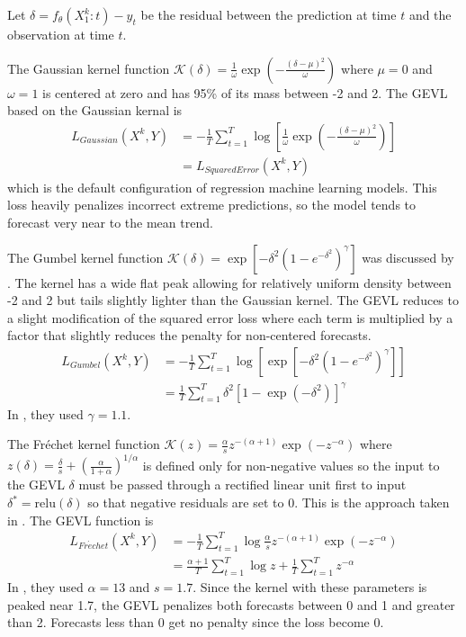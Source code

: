 \documentclass[conference]{IEEEtran}
\begin{document}
Let $\delta = f_{\theta}(X^k_1:t) - y_t$ be the residual between the prediction at time $t$ and the observation at time $t$.

The Gaussian kernel function $\mathcal{K}(\delta) = \frac{1}{\omega}\exp\left(-\frac{(\delta - \mu)^2}{\omega}\right)$ where $\mu = 0$ and $\omega = 1$ is centered at zero and has 95\% of its mass between -2 and 2. The GEVL based on the Gaussian kernal is
\begin{align*}
    L_{Gaussian}(X^k, Y) &= -\frac{1}{T} \sum_{t=1}^T \log \left[ \frac{1}{\omega}\exp\left(-\frac{(\delta - \mu)^2}{\omega} \right) \right] \\
    &= L_{SquaredError}(X^k, Y)
\end{align*}
which is the default configuration of regression machine learning models. This loss heavily penalizes incorrect extreme predictions, so the model tends to forecast very near to the mean trend.

The Gumbel kernel function $\mathcal{K}(\delta) = \exp\left[-\delta^2(1 - e^{-\delta^2})^\gamma \right]$ was discussed by \cite{zhangEnhancingTimeSeries2021}. The kernel has a wide flat peak allowing for relatively uniform density between -2 and 2 but tails slightly lighter than the Gaussian kernel. The GEVL reduces to a slight modification of the squared error loss where each term is multiplied by a factor that slightly reduces the penalty for non-centered forecasts.
\begin{align*}
    L_{Gumbel}(X^k, Y) &= -\frac{1}{T} \sum_{t=1}^T \log \left[\exp\left[-\delta^2(1 - e^{-\delta^2})^\gamma \right]\right] \\
    &= \frac{1}{T} \sum_{t=1}^T \delta^2 \left[1 - \exp\left(-\delta^2\right)\right]^\gamma
\end{align*}
In \cite{zhangEnhancingTimeSeries2021}, they used $\gamma = 1.1$.

The Fr\'echet kernel function $\mathcal{K}(z) = \frac{\alpha}{s} z^{-(\alpha + 1)} \exp\left(-z^{-\alpha}\right)$ where $z(\delta) = \frac{\delta}{s} + \left(\frac{\alpha}{1+\alpha}\right)^{1/\alpha}$ is defined only for non-negative values so the input to the GEVL $\delta$ must be passed through a rectified linear unit first to input $\delta^* = \mathrm{relu}(\delta)$ so that negative residuals are set to 0. This is the approach taken in \cite{zhangEnhancingTimeSeries2021}. The GEVL function is
\begin{align*}
    L_{Fr\acute{e}chet}(X^k, Y) &= -\frac{1}{T} \sum_{t=1}^T \log\frac{\alpha}{s} z^{-(\alpha + 1)} \exp\left(-z^{-\alpha}\right) \\
    &= \frac{\alpha+1}{T} \sum_{t=1}^T \log z + \frac{1}{T} \sum_{t=1}^T z^{-\alpha}
\end{align*}
In \cite{zhangEnhancingTimeSeries2021}, they used $\alpha = 13$ and $s = 1.7$. Since the kernel with these parameters is peaked near 1.7, the GEVL penalizes both forecasts between 0 and 1 and greater than 2. Forecasts less than 0 get no penalty since the loss become 0.
\end{document}
